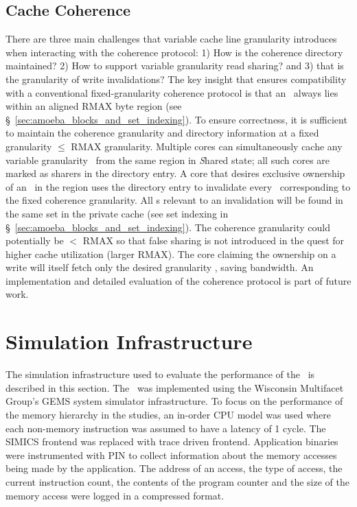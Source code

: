 
\subsection{Cache Coherence}
\label{sec:coherence}

There are three main challenges that variable cache line granularity introduces when interacting with the coherence protocol: 1) How is the coherence directory maintained? 2) How to support variable granularity read sharing? and 3) that is the granularity of write invalidations? The key insight that ensures compatibility with a conventional fixed-granularity coherence protocol is that an \AB\ always lies within an aligned RMAX byte region (see \S~\ref{sec:amoeba_blocks_and_set_indexing}). To ensure correctness, it is sufficient to maintain the coherence granularity and directory information at a fixed granularity $\leq$ RMAX granularity. Multiple cores can simultaneously cache any variable granularity \AB\ from the same region in \textit{S}hared state; all such cores are marked as sharers in the directory entry. A core that desires exclusive ownership of an \AB\ in the region uses the directory entry to invalidate every \AB\ corresponding to the fixed coherence granularity. All \AB{}s relevant to an invalidation will be found in the same set in the private cache (see set indexing in \S~\ref{sec:amoeba_blocks_and_set_indexing}). The coherence granularity could potentially be $<$ RMAX so that false sharing is not introduced in the quest  for higher cache utilization (larger RMAX). The core claiming the ownership on a write will itself fetch only the desired granularity \AB{}, saving bandwidth. An implementation and detailed evaluation of the coherence protocol is part of future work.

\section{Simulation Infrastructure}
\label{sec:simulation_infrastructure}
The simulation infrastructure used to evaluate the performance of the \AC\ is described in this section. The \AC\ was implemented using the Wisconsin Multifacet Group's GEMS\cite{Martin:2005:MGE:1105734.1105747} system simulator infrastructure. To focus on the performance of the memory hierarchy in the studies, an in-order CPU model was used where each non-memory instruction was assumed to have a latency of 1 cycle. The SIMICS frontend was replaced with trace driven frontend. Application binaries were instrumented with PIN\cite{Luk:2005:PBC:1065010.1065034} to collect information about the memory accesses being made by the application. The address of an access, the type of access, the current instruction count, the contents of the program counter and the size of the memory access were logged in a compressed format. 

